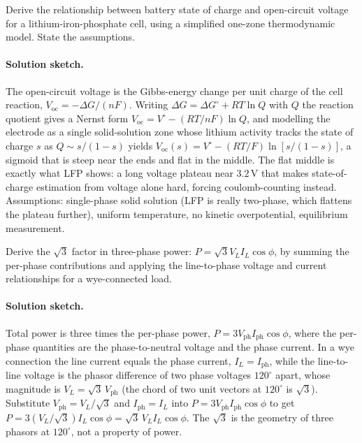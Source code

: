 \begin{exercise}
Derive the relationship between battery state of charge and
open-circuit voltage for a lithium-iron-phosphate cell, using a
simplified one-zone thermodynamic model. State the assumptions.
\paragraph{Solution sketch.}
The open-circuit voltage is the Gibbs-energy change per unit charge of
the cell reaction, $V_{\text{oc}} = -\Delta G/(nF)$. Writing $\Delta G
= \Delta G^\circ + RT\ln Q$ with $Q$ the reaction quotient gives a
Nernst form $V_{\text{oc}} = V^\circ - (RT/nF)\ln Q$, and modelling the
electrode as a single solid-solution zone whose lithium activity tracks
the state of charge $s$ as $Q \sim s/(1-s)$ yields $V_{\text{oc}}(s) =
V^\circ - (RT/F)\ln[s/(1-s)]$, a sigmoid that is steep near the ends and
flat in the middle. The flat middle is exactly what LFP shows: a long
voltage plateau near $3.2\,\si{\volt}$ that makes state-of-charge
estimation from voltage alone hard, forcing coulomb-counting instead.
Assumptions: single-phase solid solution (LFP is really two-phase, which
flattens the plateau further), uniform temperature, no kinetic
overpotential, equilibrium measurement.
\end{exercise}

\begin{exercise}
Derive the $\sqrt{3}$ factor in three-phase power: $P = \sqrt{3}V_{L}
I_{L}\cos\phi$, by summing the per-phase contributions and
applying the line-to-phase voltage and current relationships for a
wye-connected load.
\paragraph{Solution sketch.}
Total power is three times the per-phase power, $P = 3 V_{\text{ph}}
I_{\text{ph}}\cos\phi$, where the per-phase quantities are the
phase-to-neutral voltage and the phase current. In a wye connection the
line current equals the phase current, $I_L = I_{\text{ph}}$, while the
line-to-line voltage is the phasor difference of two phase voltages
$120^\circ$ apart, whose magnitude is $V_L = \sqrt{3}\,V_{\text{ph}}$
(the chord of two unit vectors at $120^\circ$ is $\sqrt{3}$). Substitute
$V_{\text{ph}} = V_L/\sqrt{3}$ and $I_{\text{ph}} = I_L$ into $P = 3
V_{\text{ph}}I_{\text{ph}}\cos\phi$ to get $P = 3(V_L/\sqrt3)I_L\cos\phi
= \sqrt{3}\,V_L I_L\cos\phi$. The $\sqrt3$ is the geometry of three
phasors at $120^\circ$, not a property of power.
\end{exercise}

